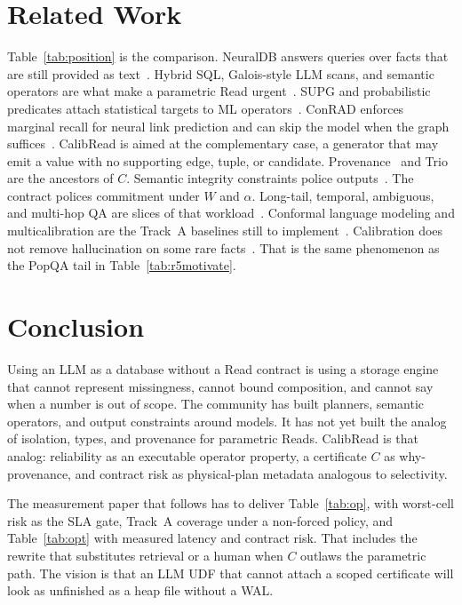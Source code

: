 \documentclass[sigconf, nonacm]{acmart}
\begin{document}
\section{Related Work}

Table~\ref{tab:position} is the comparison. NeuralDB answers queries over facts that are still provided as text~\cite{thorpe2021neuraldb}. Hybrid SQL, Galois-style LLM scans, and semantic operators are what make a parametric Read urgent~\cite{zhao2025swan,saeed2023galois,urban2024caesura,patel2025lotus,liu2025palimpzest,russo2026abacus,shankar2025docetl,liu2024suql}. SUPG and probabilistic predicates attach statistical targets to ML operators~\cite{kang2020supg,lu2018probabilistic}. ConRAD enforces marginal recall for neural link prediction and can skip the model when the graph suffices~\cite{horchidan2026conrad}. CalibRead is aimed at the complementary case, a generator that may emit a value with no supporting edge, tuple, or candidate. Provenance~\cite{green2007provenance,buneman2001why} and Trio~\cite{widom2005trio} are the ancestors of $C$. Semantic integrity constraints police outputs~\cite{lee2025sic}. The contract polices commitment under $W$ and $\alpha$. Long-tail, temporal, ambiguous, and multi-hop QA are slices of that workload~\cite{kandpal2023large,mallen2023not,min2020ambigqa,trivedi2022musique,yang2024socrates,zhang2021situatedqa,vu2024freshqa}. Conformal language modeling and multicalibration are the Track~A baselines still to implement~\cite{quach2024conformal,mohri2024language,wang2024conu,gibbs2024conformal,detommaso2024multicalibration}. Calibration does not remove hallucination on some rare facts~\cite{kalai2024calibrated}. That is the same phenomenon as the PopQA tail in Table~\ref{tab:r5motivate}.

\section{Conclusion}

Using an LLM as a database without a Read contract is using a storage engine that cannot represent missingness, cannot bound composition, and cannot say when a number is out of scope. The community has built planners, semantic operators, and output constraints around models. It has not yet built the analog of isolation, types, and provenance for parametric Reads. CalibRead is that analog: reliability as an executable operator property, a certificate $C$ as why-provenance, and contract risk as physical-plan metadata analogous to selectivity.

The measurement paper that follows has to deliver Table~\ref{tab:op}, with worst-cell risk as the SLA gate, Track~A coverage under a non-forced policy, and Table~\ref{tab:opt} with measured latency and contract risk. That includes the rewrite that substitutes retrieval or a human when $C$ outlaws the parametric path. The vision is that an LLM UDF that cannot attach a scoped certificate will look as unfinished as a heap file without a WAL.

\clearpage


\end{document}
